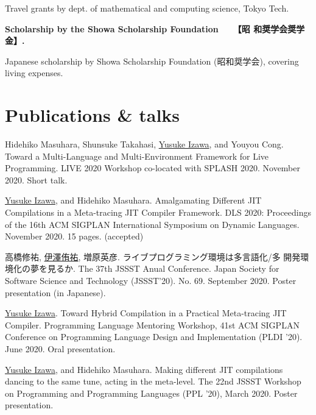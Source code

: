 \documentclass[11pt]{article} %
\newcommand{\YusukeIzawa}{\underline{Yusuke Izawa}}
\newcommand{\伊澤侑祐}{\underline{伊澤侑祐}}
\newcommand{\jit}{\textsc{JIT} }
\begin{document}
Travel grants by dept. of mathematical and computing science, Tokyo Tech.

\medskip


 \textbf{Scholarship by the Showa Scholarship Foundation~~~【昭
  和奨学会奨学金】.}

Japanese scholarship by Showa Scholarship Foundation (昭和奨学会), covering
living expenses.

\medskip


\section*{Publications \& talks}

 Hidehiko Masuhara, Shunsuke Takahasi, \YusukeIzawa, and Youyou
Cong. Toward a Multi-Language and Multi-Environment Framework for Live Programming.
LIVE 2020 Workshop co-located with SPLASH 2020. November 2020. Short talk.

 \YusukeIzawa, and Hidehiko Masuhara. Amalgamating Different \jit
Compilations in a Meta-tracing \jit Compiler Framework. DLS 2020: Proceedings of
the 16th ACM SIGPLAN International Symposium on Dynamic Languages. November
2020. 15 pages. (accepted)
\medskip

 高橋修祐, \伊澤侑祐, 増原英彦. ライブプログラミング環境は多言語化/多
開発環境化の夢を見るか. The 37th JSSST Anual Conference. Japan Society for
Software Science and Technology (JSSST'20). No. 69. September 2020. Poster
presentation (in Japanese).
\medskip

 \YusukeIzawa. Toward Hybrid Compilation in a Practical Meta-tracing
\jit Compiler. Programming Language Mentoring Workshop, 41st ACM SIGPLAN
Conference on Programming Language Design and Implementation (PLDI '20). June
2020. Oral presentation.
\medskip

 \YusukeIzawa, and Hidehiko Masuhara. Making different \jit
compilations dancing to the same tune, acting in the meta-level. The 22nd JSSST
Workshop on Programming and Programming Languages (PPL '20), March 2020. Poster
presentation.
\medskip
\end{document}

